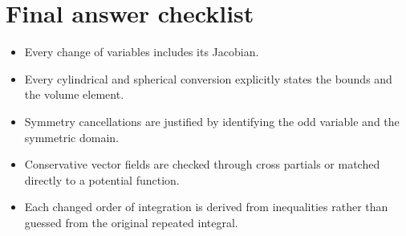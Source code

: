 \documentclass[11pt,a4paper]{article}
\begin{document}
\section*{Final answer checklist}
\begin{itemize}[leftmargin=*]
\item Every change of variables includes its Jacobian.
\item Every cylindrical and spherical conversion explicitly states the bounds and the volume element.
\item Symmetry cancellations are justified by identifying the odd variable and the symmetric domain.
\item Conservative vector fields are checked through cross partials or matched directly to a potential function.
\item Each changed order of integration is derived from inequalities rather than guessed from the original repeated integral.
\end{itemize}
\end{document}
